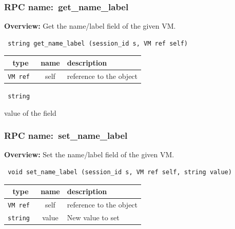 \subsubsection{RPC name:~get\_name\_label}

{\bf Overview:} 
Get the name/label field of the given VM.

\begin{verbatim} string get_name_label (session_id s, VM ref self)\end{verbatim}



 
\vspace{0.3cm}
\begin{tabular}{|c|c|p{7cm}|}
 \hline
{\bf type} & {\bf name} & {\bf description} \\ \hline
{\tt VM ref } & self & reference to the object \\ \hline 

\end{tabular}

\vspace{0.3cm}

{\tt 
string
}


value of the field
\vspace{0.3cm}
\vspace{0.3cm}
\vspace{0.3cm}
\subsubsection{RPC name:~set\_name\_label}

{\bf Overview:} 
Set the name/label field of the given VM.

\begin{verbatim} void set_name_label (session_id s, VM ref self, string value)\end{verbatim}



 
\vspace{0.3cm}
\begin{tabular}{|c|c|p{7cm}|}
 \hline
{\bf type} & {\bf name} & {\bf description} \\ \hline
{\tt VM ref } & self & reference to the object \\ \hline 

{\tt string } & value & New value to set \\ \hline 

\end{tabular}

